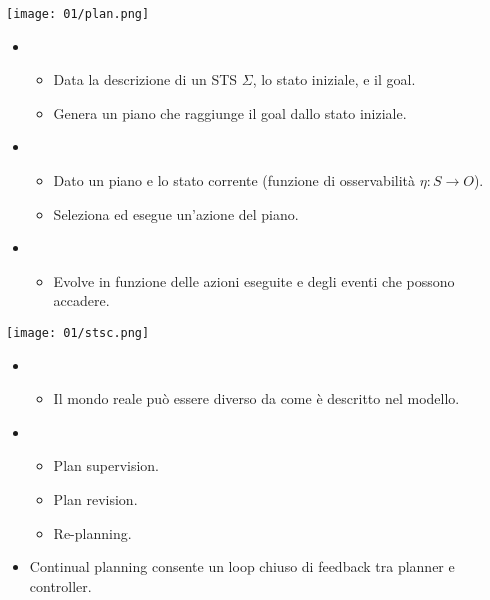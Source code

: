 \begin{minipage}{0.4\textwidth}
    \centering
    \texttt{[image: 01/plan.png]}
\end{minipage}
\hfill
\begin{minipage}{0.5\textwidth}
    \begin{itemize}
        \item {}
        \begin{itemize}
            \item Data la descrizione di un STS $\Sigma$, lo stato iniziale, e il goal.
            \item Genera un piano che raggiunge il goal dallo stato iniziale.
        \end{itemize}

        \item {}
        \begin{itemize}
            \item Dato un piano e lo stato corrente (funzione di osservabilità $\eta : S \rightarrow O$).
            \item Seleziona ed esegue un’azione del piano.
        \end{itemize}

        \item {}
        \begin{itemize}
            \item Evolve in funzione delle azioni eseguite e degli eventi che possono accadere.
        \end{itemize}
    \end{itemize}
\end{minipage}


\begin{minipage}{0.4\textwidth}
    \centering
    \texttt{[image: 01/stsc.png]}
\end{minipage}
\hfill
\begin{minipage}{0.5\textwidth}
    \begin{itemize}
        \item {}
        \begin{itemize}
            \item Il mondo reale può essere diverso da come è descritto nel modello.
        \end{itemize}
        \item {}
        \begin{itemize}
            \item Plan supervision.
            \item Plan revision.
            \item Re-planning.
        \end{itemize}

        \item Continual planning consente un loop chiuso di feedback tra planner e controller.
    \end{itemize}
\end{minipage}

